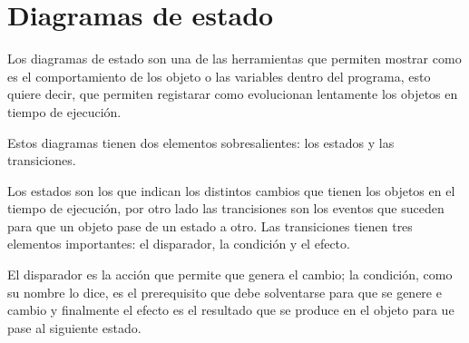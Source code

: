 \chapter{Diagramas de estado}
Los diagramas de estado son una de las herramientas que permiten mostrar como es el comportamiento de los objeto o las variables dentro del programa, esto quiere decir, que permiten registarar como evolucionan lentamente los objetos en tiempo de ejecución.

Estos diagramas tienen dos elementos sobresalientes: los estados y las transiciones.

Los estados son los que indican los distintos cambios que tienen los objetos en el tiempo de ejecución, por otro lado las trancisiones son los eventos que suceden para que un objeto pase de un estado a otro. Las transiciones tienen tres elementos importantes: el disparador, la condición y el efecto.

El disparador es la acción que permite que genera el cambio; la condición, como su nombre lo dice, es el prerequisito que debe solventarse para que se genere e cambio y finalmente el efecto es el resultado que se produce en el objeto para ue pase al siguiente estado.

